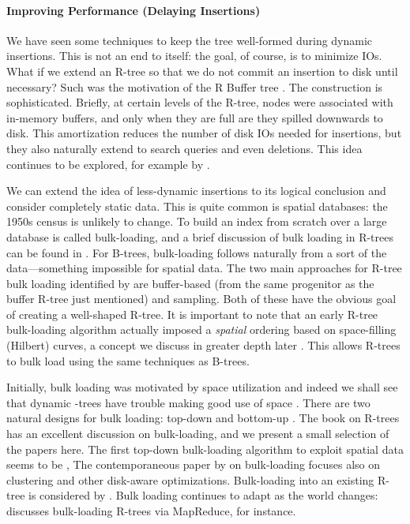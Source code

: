 \paragraph{Improving Performance (Delaying Insertions)}
We have seen some techniques to keep the tree well-formed during dynamic insertions.
This is not an end to itself: the goal, of course, is to minimize IOs.
What if we extend an R-tree so that we do not commit an insertion to disk until necessary?
Such was the motivation of the R Buffer tree \cite{argehinrichsvahrenholdvitter99}.
The construction is sophisticated.
Briefly, at certain levels of the R-tree, nodes were associated with in-memory buffers, and only when they are full are they spilled downwards to disk.
This amortization reduces the number of disk IOs needed for insertions, but they also naturally extend to search queries and even deletions.
This idea continues to be explored, for example by \cite{biveinissaltenisjensen07}.

We can extend the idea of less-dynamic insertions to its logical conclusion and consider completely static data.
This is quite common is spatial databases: the 1950s census is unlikely to change.
To build an index from scratch over a large database is called bulk-loading, and a brief discussion of bulk loading in R-trees can be found in \cite{berckenseeger01}.
For B-trees, bulk-loading follows naturally from a sort of the data---something impossible for spatial data.
The two main approaches for R-tree bulk loading identified by \cite{berckenseeger01} are buffer-based (from the same progenitor as the buffer R-tree just mentioned) and sampling.
Both of these have the obvious goal of creating a well-shaped R-tree.
It is important to note that an early R-tree bulk-loading algorithm actually imposed a \emph{spatial} ordering based on space-filling (Hilbert) curves, a concept we discuss in greater depth later \cite{kamelfaloutsos94}.
This allows R-trees to bulk load using the same techniques as B-trees.

Initially, bulk loading was motivated by space utilization \cite{garcialopezleutenegger98,kamelfaloutsos95} and indeed we shall see that dynamic \rbase-trees have trouble making good use of space \cite{huanglinlin01}.
There are two natural designs for bulk loading: top-down and bottom-up \cite{thebook}.
The book on R-trees \cite{thebook} has an excellent discussion on bulk-loading, and we present a small selection of the papers here.
The first top-down bulk-loading algorithm to exploit spatial data seems to be \cite{garcialopezleutenegger98},
The contemporaneous paper by \cite{berchtoldbohmkriegel98} on bulk-loading focuses also on clustering and other disk-aware optimizations.
Bulk-loading into an existing R-tree is considered by \cite{chenchoubeyrundensteiner98}.
Bulk loading continues to adapt as the world changes: \cite{tanluomaoni12} discusses bulk-loading R-trees via MapReduce, for instance.


